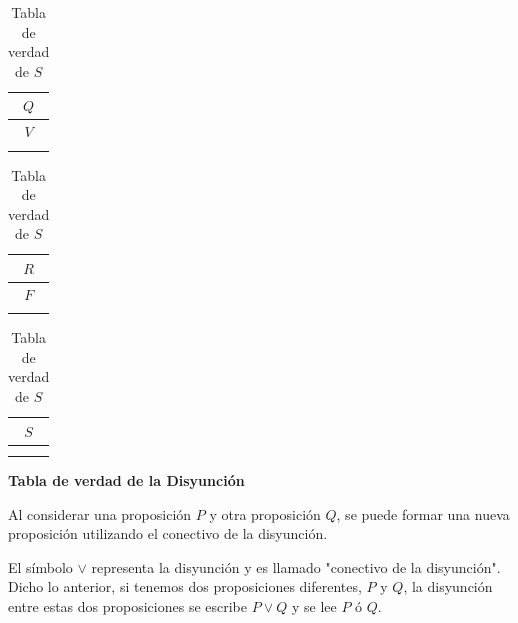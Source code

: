\documentclass[letterpaper, twoside]{article}
\begin{document}
\begin{table}[htbp]

  \centering
    \begin{minipage}[t]{0.31\textwidth}
      \centering
      \begin{tabular}{|c|}
        \hline
        $Q$ \\ \hline
        $V$ \\ \hline
            \\ 
        \hline
      \end{tabular}
      \caption*{Tabla de verdad de $Q$}
    \end{minipage}%
    \hfill
    \begin{minipage}[t]{0.31\textwidth}
      \centering
      \begin{tabular}{|c|}
        \hline
        $R$ \\ \hline
        $F$ \\ \hline
            \\ 
        \hline
      \end{tabular}
      \caption*{Tabla de verdad de $R$}
    \end{minipage}%
    \hfill
    \begin{minipage}[t]{0.31\textwidth}
      \centering
      \begin{tabular}{|c|}
        \hline
        $S$ \\ \hline
            \\ \hline
            \\ 
        \hline
      \end{tabular}
      \caption*{Tabla de verdad de $S$}
    \end{minipage}

\end{table}

\vspace{1cm}

\textbf{Tabla de verdad de la Disyunción}\par

\vspace{.5cm}

Al considerar una proposición $P$ y otra proposición $Q$, se puede formar una nueva proposición utilizando el conectivo de la disyunción.\par

\vspace{.5cm}

El símbolo $\boldsymbol{\lor}$ representa la disyunción y es llamado "conectivo de la disyunción". Dicho lo anterior, si tenemos dos proposiciones diferentes, $P$ y $Q$, la disyunción entre estas dos proposiciones se escribe $P\lor Q$ y se lee $P$ ó $Q$.\par
\end{document}
